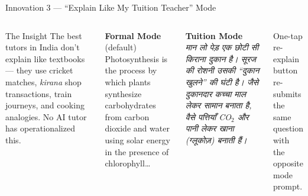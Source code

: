 \documentclass[aspectratio=169, 12pt]{beamer}
\begin{document}
\begin{frame}{Innovation 3 — ``Explain Like My Tuition Teacher'' Mode}
  \begin{columns}[T]
      \begin{block}{The Insight}
        The best tutors in India don't explain like textbooks ---
        they use cricket matches, \emph{kirana} shop transactions,
        train journeys, and cooking analogies.
        No AI tutor has operationalized this.
      \end{block}
      \vspace{6pt}
      \textbf{Formal Mode} (default)\\
      {\small Photosynthesis is the process by which plants synthesize
      carbohydrates from carbon dioxide and water using solar energy
      in the presence of chlorophyll\ldots}
      \vspace{8pt}

      \textbf{Tuition Mode}\\
      {\small \emph{मान लो पेड़ एक छोटी सी किराना दुकान है। सूरज की रोशनी उसकी
      ``दुकान खुलने'' की घंटी है। जैसे दुकानदार कच्चा माल लेकर सामान बनाता
      है, वैसे पत्तियाँ CO$_2$ और पानी लेकर खाना (ग्लूकोज़) बनाती हैं।}}
      \vspace{4pt}
      {\scriptsize One-tap re-explain button re-submits the\\
      same question with the opposite mode prompt.}
  \end{columns}
\end{frame}
\end{document}
